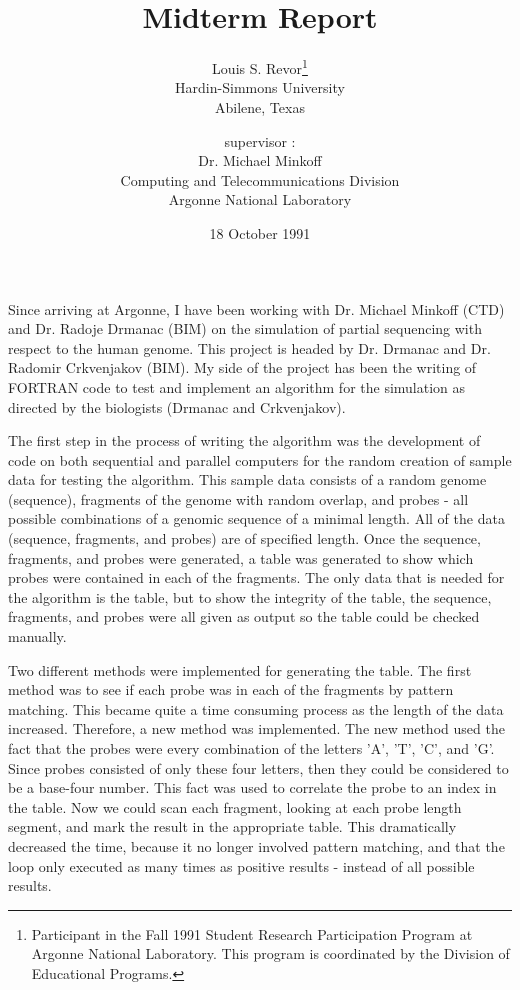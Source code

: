 
\title{Midterm Report}
\author{Louis S. Revor\thanks{
     Participant in the Fall 1991 Student Research
     Participation Program at Argonne National Laboratory.
     This program is coordinated by the Division
     of Educational Programs.}\\
     Hardin-Simmons University\\
     Abilene, Texas\\
   \and
     supervisor :\\
     Dr. Michael Minkoff\\
     Computing and Telecommunications Division\\
     Argonne National Laboratory}
\date{18 October 1991}
\maketitle
Since arriving at Argonne, I have been working with Dr. Michael Minkoff
(CTD) and Dr. Radoje Drmanac (BIM) on the simulation of partial sequencing
with respect to the human
genome.  This project is headed by Dr. Drmanac and Dr. Radomir
Crkvenjakov (BIM).  My side of the project has been the writing of
FORTRAN code to test and implement an algorithm for the simulation as
directed by the biologists (Drmanac and Crkvenjakov).

The first step in the process of writing the algorithm was the development
of code on both sequential and parallel computers for the random creation of
sample data for testing the algorithm.  This sample data consists of a
random genome (sequence), fragments of the genome with random overlap, and
probes -
all possible combinations of a genomic sequence of a minimal length.  All
of the data (sequence, fragments, and probes) are of specified length.
Once the sequence, fragments, and probes were generated, a table was
generated to show which probes were contained in each of the fragments.
The only data that is needed for the algorithm is the table, but to show
the integrity of the table, the sequence, fragments, and probes were all
given as output so the table could be checked manually.

Two different methods were implemented for generating the table.  The
first method was to see if each probe was in each of
the fragments by pattern matching.  This became quite a time consuming
process as the length of the data increased.  Therefore, a new method was
implemented.  The new method used the fact that the probes were every
combination of the letters 'A', 'T', 'C', and 'G'.  Since probes
consisted of only these four letters, then they could be considered to be
a base-four number.  This fact was used to correlate the probe to an
index in the table.  Now we could scan each fragment,
looking at each probe length segment, and mark the result in the
appropriate table.  This dramatically decreased the time, because it no
longer involved pattern matching, and that the loop only executed as many
times as positive results - instead of all possible results.

